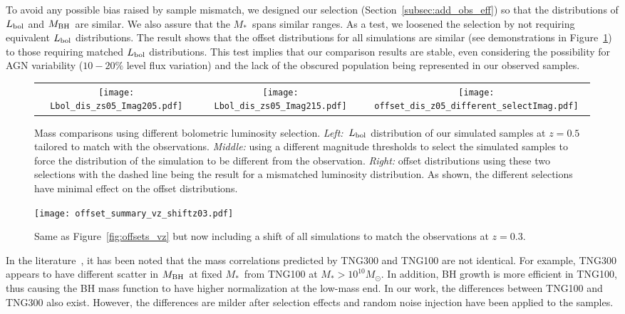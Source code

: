 \documentclass[twocolumn]{aastex631}
\def\smass{{$M_*$}}
\def\mbh{$M_{\rm BH}$}
\begin{document}
To avoid any possible bias raised by sample mismatch, we designed our selection (Section~\ref{subsec:add_obs_eff}) so that the distributions of $L_{\rm bol}$ and \mbh\ are similar. We also assure that the \smass\ spans similar ranges. As a test, we loosened the selection by not requiring equivalent $L_{\rm bol}$ distributions. The result shows that the offset distributions for all simulations are similar (see demonstrations in Figure~\ref{fig:offsets_nochange}) to those requiring matched $L_{\rm bol}$ distributions. This test implies that our comparison results are stable, even considering the possibility for AGN variability ($10-20\%$ level flux variation) and the lack of the obscured population being represented in our observed samples.

\begin{figure*}
\centering
\begin{tabular}{c c c}
\hspace*{-0.4cm} 
{\texttt{[image: Lbol\_dis\_zs05\_Imag205.pdf]}}&
\hspace*{-0.4cm} 
{\texttt{[image: Lbol\_dis\_zs05\_Imag215.pdf]}}&
\hspace*{-0.4cm} 
{\texttt{[image: offset\_dis\_z05\_different\_selectImag.pdf]}}\\
\end{tabular}
\caption{\label{fig:offsets_nochange} 
Mass comparisons using different bolometric luminosity selection. {\it Left:}~$L_{\rm bol}$ distribution of our simulated samples at $z=0.5$ tailored to match with the observations. {\it Middle:} using a different magnitude thresholds to select the simulated samples to force the distribution of the simulation to be different from the observation.  {\it Right:} offset distributions using these two selections with the dashed line being the result for a mismatched luminosity distribution. As shown, the different selections have minimal effect on the offset distributions.
}
\end{figure*} 


\begin{figure}
\centering
\texttt{[image: offset\_summary\_vz\_shiftz03.pdf]}
\caption{\label{fig:offsets_vz_shiftz03} 
Same as Figure~\ref{fig:offsets_vz} but now including a shift of all simulations to match the observations at $z=0.3$.
}
\end{figure} 

In the literature~\citep{Weinberger2018, Habouzit2021}, it has been noted that the mass correlations predicted by TNG300 and TNG100 are not identical. For example, TNG300 appears to have different scatter in \mbh\ at fixed \smass\ from TNG100 at \smass $>10^{10}M_{\odot}$. In addition, BH growth is more efficient in TNG100, thus causing the BH mass function to have higher normalization at the low-mass end. In our work, the differences between TNG100 and TNG300 also exist. However, the differences are milder after selection effects and random noise injection have been applied to the samples.
\end{document}
